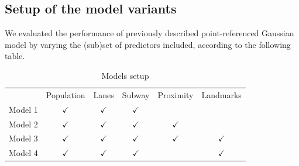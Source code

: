 \documentclass[12pt]{article}
\begin{document}
\subsection{Setup of the model variants}

We evaluated the performance of previously described point-referenced Gaussian model by varying the (sub)set of predictors included, according to the following table.
\begin{table}[H]
	\centering
	\begin{tabular*}{0.75\textwidth}{ r|c|c|c|c|c| }
	\multicolumn{1}{r}{}
	&  \multicolumn{1}{c}{Population}
	&  \multicolumn{1}{c}{Lanes} 
	&  \multicolumn{1}{c}{Subway}
	&  \multicolumn{1}{c}{Proximity}
	&  \multicolumn{1}{c}{Landmarks} \\
	\cline{2-6}
	Model 1 & $\checkmark$ & $\checkmark$ & $\checkmark$ &  & \\
	\cline{2-6}
	Model 2 & $\checkmark$ & $\checkmark$ & $\checkmark$ & $\checkmark$ & \\
	\cline{2-6}
	Model 3 & $\checkmark$ & $\checkmark$ & $\checkmark$ & $\checkmark$ & $\checkmark$ \\
	\cline{2-6}
	Model 4 & $\checkmark$ & $\checkmark$ & $\checkmark$ &  & $\checkmark$ \\
	\cline{2-6}
	\end{tabular*}
	\caption{Models setup}
\end{table}
\end{document}
